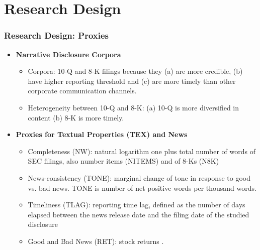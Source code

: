 \documentclass{beamer}
\begin{document}
\section{Research Design}
\begin{frame}
\frametitle{Research Design: Proxies}
\begin{itemize}

\item \textbf{Narrative Disclosure Corpora}

	\begin{itemize}
		\item Corpora: 10-Q and 8-K filings because they (a) are more credible, (b) have higher reporting threshold and (c) are more timely than other corporate communication channels.
		\item Heterogeneity between 10-Q and 8-K: (a) 10-Q is more diversified in content (b) 8-K is more timely.
	\end{itemize}

\medskip
\pause

\item \textbf{Proxies for Textual Properties (TEX) and News}
	\begin{itemize}
		\item Completeness (NW): natural logarithm one plus total number of words of SEC filings, also number items (NITEMS) and of 8-Ks (N8K) \pause
		\item News-consistency (TONE): marginal change of tone in response to  good vs. bad news. TONE is number of net positive words per thousand words. \pause
		\item Timeliness (TLAG): reporting time lag, defined as the number of days elapsed between the news release date and the filing date of the studied disclosure \pause
		\item Good and Bad News (RET): stock returns \citep{basuConservatismPrincipleAsymmetric1997}.
	\end{itemize}

\end{itemize}
\end{frame}
\end{document}
